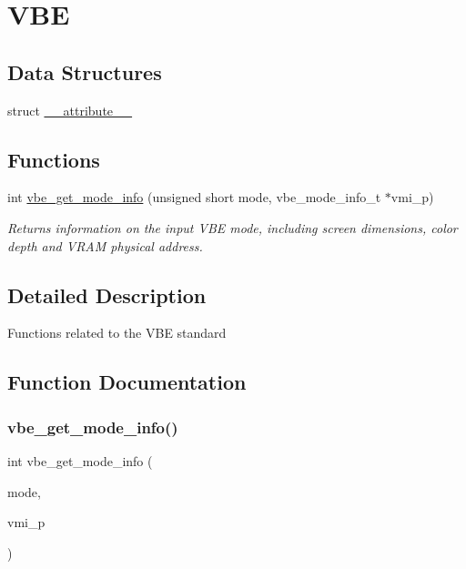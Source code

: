 \hypertarget{group___v_b_e}{}\section{V\+BE}
\label{group___v_b_e}
\subsection*{Data Structures}
\begin{DoxyCompactItemize}
\item 
struct \hyperlink{struct____attribute____}{\+\_\+\+\_\+attribute\+\_\+\+\_\+}
\end{DoxyCompactItemize}
\subsection*{Functions}
\begin{DoxyCompactItemize}
\item 
int \hyperlink{group___v_b_e_ga4ef3234e41f2050bc094a22049b69e45}{vbe\+\_\+get\+\_\+mode\+\_\+info} (unsigned short mode, vbe\+\_\+mode\+\_\+info\+\_\+t $\ast$vmi\+\_\+p)
\begin{DoxyCompactList}\small\item\em Returns information on the input V\+BE mode, including screen dimensions, color depth and V\+R\+AM physical address. \end{DoxyCompactList}\end{DoxyCompactItemize}


\subsection{Detailed Description}
Functions related to the V\+BE standard 

\subsection{Function Documentation}
\mbox{\label{group___v_b_e_ga4ef3234e41f2050bc094a22049b69e45}} 
\subsubsection{\texorpdfstring{vbe\+\_\+get\+\_\+mode\+\_\+info()}{vbe\_get\_mode\_info()}}
{\footnotesize\ttfamily int vbe\+\_\+get\+\_\+mode\+\_\+info (\begin{DoxyParamCaption}\item[{unsigned short}]{mode,  }\item[{vbe\+\_\+mode\+\_\+info\+\_\+t $\ast$}]{vmi\+\_\+p }\end{DoxyParamCaption})}



